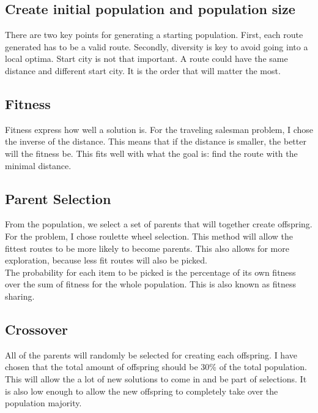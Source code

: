 \documentclass{article}
\begin{document}
    \subsection{Create initial population and population size}

    There are two key points for generating a starting population. First, each route generated has to be a valid route. 
    Secondly, diversity is key to avoid going into a local optima. Start city is not that important. A route could have the same distance and different start city. 
    It is the order that will matter the most. 

    \subsection{Fitness}

    Fitness express how well a solution is. For the traveling salesman problem, I chose the inverse of the distance. This means that if the distance is smaller, the better will the fitness be.
    This fits well with what the goal is: find the route with the minimal distance.

    \subsection{Parent Selection}

    From the population, we select a set of parents that will together create offspring. 
    For the problem, I chose roulette wheel selection. This method will allow the fittest routes to be more likely to become parents. 
    This also allows for more exploration, because less fit routes will also be picked. \\ 

    The probability for each item to be picked is the percentage of its own fitness over the sum of fitness for the whole population. This is also known as fitness sharing. 

    \subsection{Crossover}

    All of the parents will randomly be selected for creating each offspring. I have chosen that the total amount of offspring should be 30\% of the total population. 
    This will allow the a lot of new solutions to come in and be part of selections. It is also low enough to allow the new offspring to completely take over the population majority.\\
\end{document}
